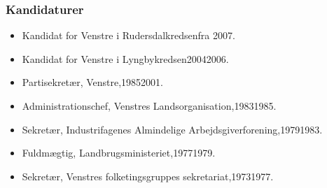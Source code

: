 \documentclass[11pt, a4paper]{awesome-cv}
\begin{document}
\begin{cvletter}
\subsubsection*{Kandidaturer}
\begin{itemize}
\item Kandidat for Venstre i Rudersdalkredsenfra 2007.
\item Kandidat for Venstre i Lyngbykredsen20042006.
\end{itemize}
\begin{itemize}
\item Partisekretær, Venstre,19852001.
\item Administrationschef, Venstres Landsorganisation,19831985.
\item Sekretær, Industrifagenes Almindelige Arbejdsgiverforening,19791983.
\item Fuldmægtig, Landbrugsministeriet,19771979.
\item Sekretær, Venstres folketingsgruppes sekretariat,19731977.
\end{itemize}
\end{cvletter}
\end{document}
